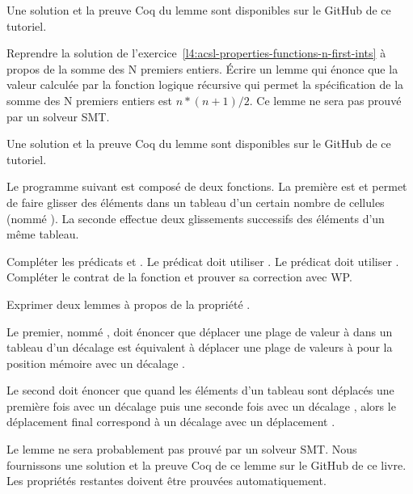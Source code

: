 Une solution et la preuve Coq du lemme sont disponibles sur le GitHub de ce tutoriel.


\label{l4:acsl-properties-lemmas-n-first-ints}


Reprendre la solution de l'exercice~\ref{l4:acsl-properties-functions-n-first-ints}
à propos de la somme des N premiers entiers. Écrire un lemme qui énonce que la valeur
calculée par la fonction logique récursive qui permet la spécification de la somme des
N premiers entiers est $n*(n+1)/2$. Ce lemme ne sera pas prouvé par un solveur SMT.


Une solution et la preuve Coq du lemme sont disponibles sur le GitHub de ce tutoriel.


\label{l4:acsl-properties-lemmas-shift-trans}


Le programme suivant est composé de deux fonctions. La première est
 et permet de faire glisser des éléments dans un tableau
d'un certain nombre de cellules (nommé ). La seconde effectue deux
glissements successifs des éléments d'un même tableau.





Compléter les prédicats  et .
Le prédicat  doit utiliser .
Le prédicat  doit utiliser .
Compléter le contrat de la fonction  et prouver
sa correction avec WP.


Exprimer deux lemmes à propos de la propriété .


Le premier, nommé , doit énoncer que déplacer une plage de
valeur  à  dans un tableau 
d'un décalage  est équivalent à déplacer une plage de valeurs
 à  pour la position mémoire 
avec un décalage .


Le second doit énoncer que quand les éléments d'un tableau sont déplacés une première
fois avec un décalage  puis une seconde fois avec un décalage
, alors le déplacement final correspond à un décalage avec un
déplacement .


Le lemme  ne sera probablement pas prouvé par un solveur SMT.
Nous fournissons une solution et la preuve Coq de ce lemme sur le GitHub de ce livre.
Les propriétés restantes doivent être prouvées automatiquement.


